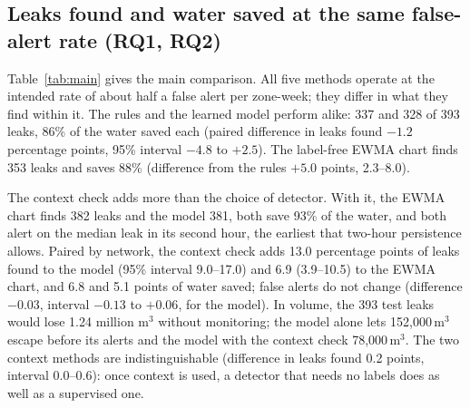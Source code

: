 \documentclass[11pt,a4paper]{article}
\begin{document}
\subsection{Leaks found and water saved at the same false-alert rate (RQ1, RQ2)}

Table~\ref{tab:main} gives the main comparison. All five methods operate at the intended rate of about half a false alert per zone-week; they differ in what they find within it. The rules and the learned model perform alike: 337 and 328 of 393 leaks, 86\% of the water saved each (paired difference in leaks found $-1.2$ percentage points, 95\% interval $-4.8$ to $+2.5$). The label-free EWMA chart finds 353 leaks and saves 88\% (difference from the rules $+5.0$ points, 2.3--8.0).

The context check adds more than the choice of detector. With it, the EWMA chart finds 382 leaks and the model 381, both save 93\% of the water, and both alert on the median leak in its second hour, the earliest that two-hour persistence allows. Paired by network, the context check adds 13.0 percentage points of leaks found to the model (95\% interval 9.0--17.0) and 6.9 (3.9--10.5) to the EWMA chart, and 6.8 and 5.1 points of water saved; false alerts do not change (difference $-0.03$, interval $-0.13$ to $+0.06$, for the model). In volume, the 393 test leaks would lose 1.24 million m$^3$ without monitoring; the model alone lets 152{,}000\,m$^3$ escape before its alerts and the model with the context check 78{,}000\,m$^3$. The two context methods are indistinguishable (difference in leaks found 0.2 points, interval 0.0--0.6): once context is used, a detector that needs no labels does as well as a supervised one.
\end{document}
